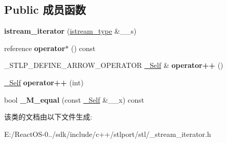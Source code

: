 \subsection*{Public 成员函数}
\begin{DoxyCompactItemize}
\item 
\mbox{\label{classistream__iterator_a2d5d2451dcd007e0fdc737b9ac397d34}} 
{\bfseries istream\+\_\+iterator} (\hyperlink{classbasic__istream}{istream\+\_\+type} \&\+\_\+\+\_\+s)
\item 
\mbox{\label{classistream__iterator_a00a8506bad1388abc931eeb807cb6c47}} 
reference {\bfseries operator$\ast$} () const
\item 
\mbox{\label{classistream__iterator_a10f595411444c3ee6dc3e2df930e258d}} 
\+\_\+\+S\+T\+L\+P\+\_\+\+D\+E\+F\+I\+N\+E\+\_\+\+A\+R\+R\+O\+W\+\_\+\+O\+P\+E\+R\+A\+T\+OR \hyperlink{classistream__iterator}{\+\_\+\+Self} \& {\bfseries operator++} ()
\item 
\mbox{\label{classistream__iterator_a811ac71bb653dc32aa1ec48355092359}} 
\hyperlink{classistream__iterator}{\+\_\+\+Self} {\bfseries operator++} (int)
\item 
\mbox{\label{classistream__iterator_acf52c834955d4bb946992b15baf30dfe}} 
bool {\bfseries \+\_\+\+M\+\_\+equal} (const \hyperlink{classistream__iterator}{\+\_\+\+Self} \&\+\_\+\+\_\+x) const
\end{DoxyCompactItemize}


该类的文档由以下文件生成\+:\begin{DoxyCompactItemize}
\item 
E\+:/\+React\+O\+S-\/0../sdk/include/c++/stlport/stl/\+\_\+stream\+\_\+iterator.\+h\end{DoxyCompactItemize}

